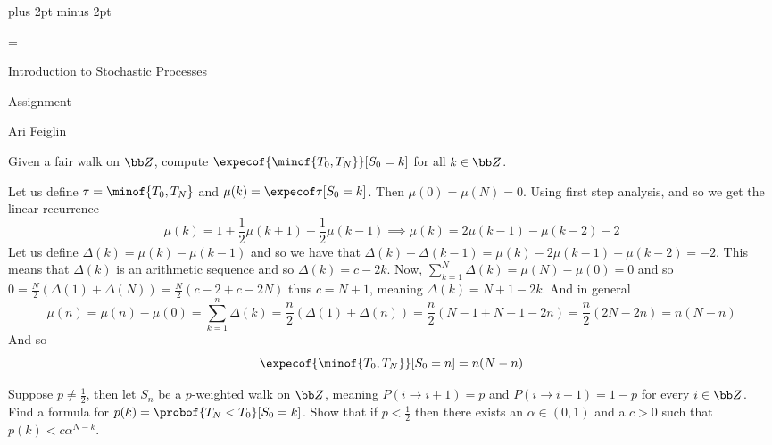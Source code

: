 

\parindent=0cm
\parskip=3pt plus 2pt minus 2pt





\footline={}

\def\printmcount{\the\counter{section}.\the\counter{math counter}}
\setcounter{section}{5}


{

    \centerline{Introduction to Stochastic Processes}
    \smallskip
    \centerline{Assignment \the{}}
    \centerline{Ari Feiglin}

\eppbox}

\bigskip

\bexerc

    Given a fair walk on ${\bb Z}$, compute $\expecof{\minof{T_0,T_N}}[S_0=k]$ for all $k\in{\bb Z}$.

\eexerc

Let us define $\tau=\minof{T_0,T_N}$ and $\mu(k)=\expecof\tau[S_0=k]$.
Then $\mu(0)=\mu(N)=0$.
Using first step analysis,
and so we get the linear recurrence
$$ \mu(k) = 1 + \frac12\mu(k+1) + \frac12\mu(k-1) \implies \mu(k) = 2\mu(k-1) - \mu(k-2) - 2 $$
Let us define $\Delta(k)=\mu(k)-\mu(k-1)$ and so we have that $\Delta(k)-\Delta(k-1)=\mu(k)-2\mu(k-1)+\mu(k-2)=-2$.
This means that $\Delta(k)$ is an arithmetic sequence and so $\Delta(k)=c-2k$.
Now, $\sum_{k=1}^N\Delta(k)=\mu(N)-\mu(0)=0$ and so $0=\frac N2(\Delta(1)+\Delta(N))=\frac N2(c-2+c-2N)$ thus $c=N+1$, meaning $\Delta(k)=N+1-2k$.
And in general
$$ \mu(n) = \mu(n) - \mu(0) = \sum_{k=1}^n\Delta(k) = \frac n2(\Delta(1) + \Delta(n)) = \frac n2(N-1+N+1-2n) = \frac n2(2N-2n) = n(N-n) $$
And so
$$ \expecof{\minof{T_0,T_N}}[S_0=n] = n(N-n) $$

\bexerc

    Suppose $p\neq\frac12$, then let $S_n$ be a $p$-weighted walk on ${\bb Z}$, meaning $P(i\to i+1)=p$ and $P(i\to i-1)=1-p$ for every $i\in{\bb Z}$.
    Find a formula for $p(k)=\probof{T_N<T_0}[S_0=k]$.
    Show that if $p<\frac12$ then there exists an $\alpha\in(0,1)$ and a $c>0$ such that $p(k)<c\alpha^{N-k}$.

